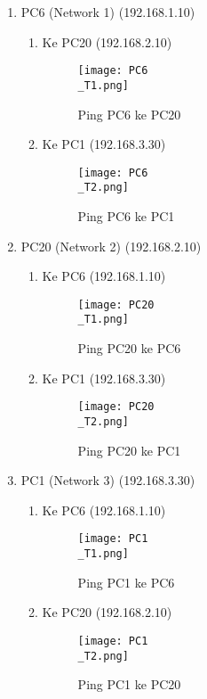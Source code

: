 \documentclass[12pt, a4paper]{article}
\begin{document}
  \begin{enumerate}

    \item PC6 (Network 1) (192.168.1.10)
      \begin{enumerate}
        \item Ke PC20 (192.168.2.10)
          \begin{figure}[h]
              \centering
              \texttt{[image: PC6\\\_T1.png]}
              \caption{\small{Ping PC6 ke PC20}}
          \end{figure}
        \item Ke PC1 (192.168.3.30)
          \begin{figure}[h]
              \centering
              \texttt{[image: PC6\\\_T2.png]}
              \caption{\small{Ping PC6 ke PC1}}
          \end{figure}
      \end{enumerate}

    \item PC20 (Network 2) (192.168.2.10)
      \begin{enumerate}
        \item Ke PC6 (192.168.1.10)
          \begin{figure}[h]
              \centering
              \texttt{[image: PC20\\\_T1.png]}
              \caption{\small{Ping PC20 ke PC6}}
          \end{figure}

    \newpage

        \item Ke PC1 (192.168.3.30)
          \begin{figure}[h]
              \centering
              \texttt{[image: PC20\\\_T2.png]}
              \caption{\small{Ping PC20 ke PC1}}
          \end{figure}
      \end{enumerate}

    \item PC1 (Network 3) (192.168.3.30)
      \begin{enumerate}
        \item Ke PC6 (192.168.1.10)
          \begin{figure}[h]
              \centering
              \texttt{[image: PC1\\\_T1.png]}
              \caption{\small{Ping PC1 ke PC6}}
          \end{figure}
        \item Ke PC20 (192.168.2.10)
          \begin{figure}[h]
              \centering
              \texttt{[image: PC1\\\_T2.png]}
              \caption{\small{Ping PC1 ke PC20}}
          \end{figure}
      \end{enumerate}

  \end{enumerate}
\end{document}
